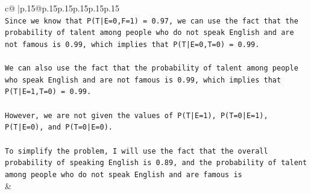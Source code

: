 \documentclass{article}
\begin{document}
{\begin{supertabular}{c@{$\;$}|p{.15\linewidth}@{}p{.15\linewidth}p{.15\linewidth}p{.15\linewidth}p{.15\linewidth}p{.15\linewidth}}
{{{\\ 
\texttt{Since we know that P(T|E=0,F=1) = 0.97, we can use the fact that the probability of talent among people who do not speak English and are not famous is 0.99, which implies that P(T|E=0,T=0) = 0.99.} \\
\\ 
\texttt{We can also use the fact that the probability of talent among people who speak English and are not famous is 0.99, which implies that P(T|E=1,T=0) = 0.99.} \\
\\ 
\texttt{However, we are not given the values of P(T|E=1), P(T=0|E=1), P(T|E=0), and P(T=0|E=0). } \\
\\ 
\texttt{To simplify the problem, I will use the fact that the overall probability of speaking English is 0.89, and the probability of talent among people who do not speak English and are famous is} \\
            }
        }
    }
    & \\ \\

\end{supertabular}
}
\end{document}
